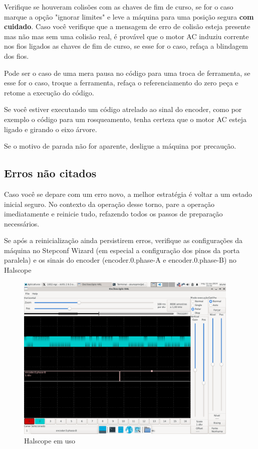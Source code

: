 \documentclass[twoside,a4paper]{refart}
\begin{document}
Verifique se houveram colisões com as chaves de fim de curso, se for o caso marque a opção "ignorar limites" e leve a máquina para uma posição segura \textbf{com cuidado}. Caso você verifique que a mensagem de erro de colisão esteja presente mas não mas sem uma colisão real, é provável que o motor AC induziu corrente nos fios ligados as chaves de fim de curso, se esse for o caso, refaça a blindagem dos fios. 

Pode ser o caso de uma mera pausa no código para uma troca de ferramenta, se esse for o caso, troque a ferramenta, refaça o referenciamento do zero peça e retome a execução do código.

Se você estiver executando um código atrelado ao sinal do encoder, como por exemplo o código para um rosqueamento, tenha certeza que o motor AC esteja ligado e girando o eixo árvore.

\attention Se o motivo de parada não for aparente, desligue a máquina por precaução.

\subsection{Erros não citados}

Caso você se depare com um erro novo, a melhor estratégia é voltar a um estado inicial seguro. No contexto da operação desse torno, pare a operação imediatamente e reinicie tudo, refazendo todos os passos de preparação necessários.

Se após a reinicialização ainda persistirem erros, verifique as configurações da máquina no Stepconf Wizard (em especial a configuração dos pinos da porta paralela) e os sinais do encoder (encoder.0.phase-A e encoder.0.phase-B) no Halscope

\begin{figure}[H]
    \begin{center}
        \includegraphics[width=0.95\textwidth]{imagens/halscope.png}
    \end{center}
    \caption{Halscope em uso}\label{halscope}
\end{figure}
\end{document}
